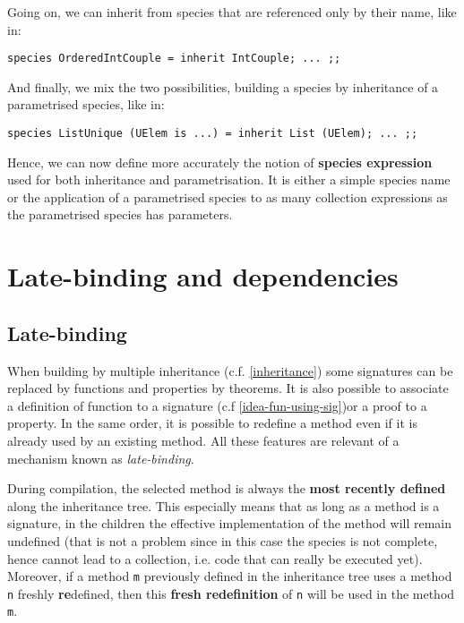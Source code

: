 Going on, we can  inherit
from species that are referenced only by their name, like in:
{\scriptsize
\begin{lstlisting}
species OrderedIntCouple = inherit IntCouple; ... ;;
\end{lstlisting}
}

And finally, we mix the two possibilities, building a species by
inheritance of a parametrised species, like in: {\scriptsize
\begin{lstlisting}
species ListUnique (UElem is ...) = inherit List (UElem); ... ;;
\end{lstlisting}
}

Hence, we can now define more accurately the notion of {\bf species
expression} used for both inheritance and parametrisation. It is either
a simple species name or the application of a parametrised species to
as many collection expressions as the parametrised species has
parameters.


\section{Late-binding and dependencies}

\subsection{Late-binding}
\label{late-binding}
 When building by multiple inheritance
(c.f. \ref{inheritance}) some signatures can be replaced by functions
and properties by theorems. It is also possible to associate a
definition of function to a signature (c.f \ref{idea-fun-using-sig})or
a proof to a property. In the same order, it is possible to redefine a
method even if it is  already used by an existing method.
All these features are relevant of a mechanism known as {\em
  late-binding}. 


During compilation, the selected method is always the {\bf most
recently defined} along the inheritance tree. This especially means
that as long as a method is a signature, in the children the effective
implementation of the method will remain undefined (that is not a
problem since in this case the species is not complete, hence cannot
lead to a collection, i.e. code that can really be executed
yet). Moreover, if a method {\tt m} previously defined in the
inheritance tree uses a method {\tt n} freshly {\bf re}defined, then
this {\bf fresh redefinition} of {\tt n} will be used in the method
{\tt m}.

